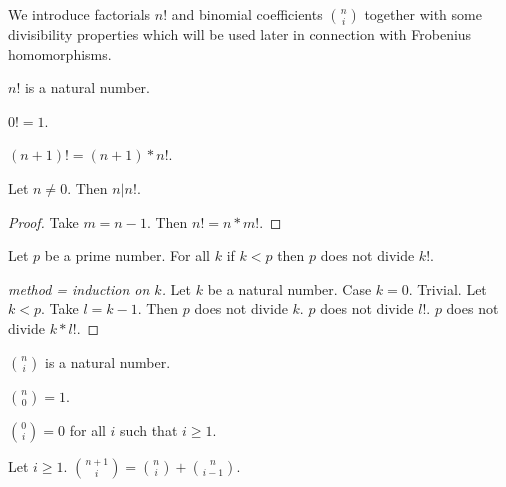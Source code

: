 \documentclass[english,11pt]{article}
\begin{document}
\newcommand{\cho}[2]{{#1 \choose #2}}

We introduce factorials $n!$ and binomial coefficients
$\cho{n}{i}$ together with some divisibility properties
which will be used later in connection with
Frobenius homomorphisms.

\newcommand{\fac}[1]{#1 !}

\begin{forthel}

\begin{signature}
$\fac{n}$ is a natural number.
\end{signature}

\begin{axiom}
$\fac{0} = 1$.
\end{axiom}

\begin{axiom}
$\fac{(n+1)} = (n+1) * \fac{n}$.
\end{axiom}

\begin{lemma} Let $n \neq 0$. Then $n | \fac{n}$.
\end{lemma}
\begin{proof}
Take $m = n - 1$.
Then $\fac{n} = n * \fac{m}$.
\end{proof}

\begin{lemma}
Let $p$ be a prime number.
For all $k$ if $k < p$ then $p$ does not divide $\fac{k}$.
\end{lemma}
\begin{proof}[method = induction on $k$]
Let $k$ be a natural number.
Case $k = 0$. Trivial.
Let $k < p$.
Take $l = k - 1$.
Then $p$ does not divide $k$. $p$ does not divide $\fac{l}$.
$p$ does not divide $k * \fac{l}$.
\end{proof}

\begin{signature}
$\cho{n}{i}$ is a natural number.
\end{signature}

\begin{axiom}
$\cho{n}{0} = 1$.
\end{axiom}

\begin{axiom}
$\cho{0}{i} = 0$ for all $i$ such that $i \geq 1$.
\end{axiom}

\begin{axiom} Let $i \geq 1$.
$\cho{n+1}{i} = \cho{n}{i} + \cho{n}{i-1}$.
\end{axiom}


\end{forthel}
\end{document}
